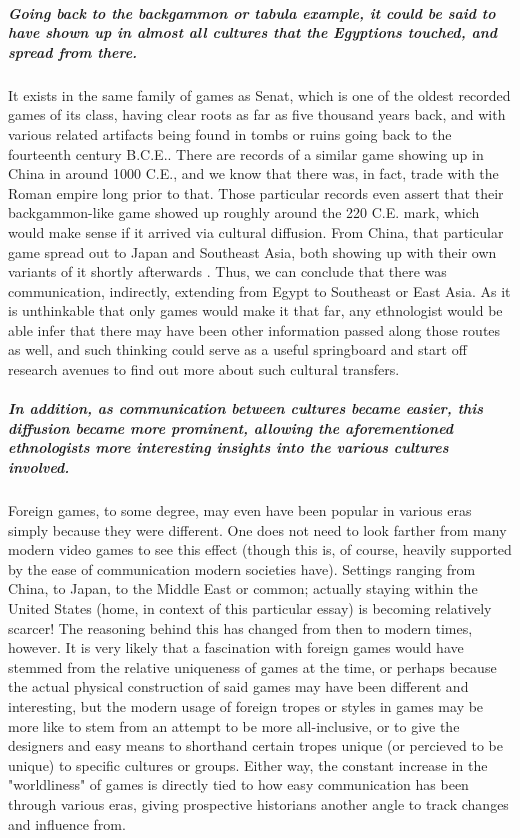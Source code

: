 \subparagraph{Going back to the backgammon or tabula example, it could be said to have shown up in almost all cultures that the Egyptions touched, and spread from there.}
It exists in the same family of games as Senat, which is one of the oldest recorded games of its class, having clear roots as far as five thousand years back, and with various related artifacts being found
in tombs or ruins going back to the fourteenth century B.C.E..
There are records of a similar game showing up in China in around 1000 C.E., and we know that there was, in fact, trade with the Roman empire long prior to that.
Those particular records even assert that their backgammon-like game showed up roughly around the 220 C.E. mark, which would make sense if it arrived via cultural diffusion.
From China, that particular game spread out to Japan and Southeast Asia, both showing up with their own variants of it shortly afterwards \citep{botermans2008}.
Thus, we can conclude that there was communication, indirectly, extending from Egypt to Southeast or East Asia.
As it is unthinkable that only games would make it that far, any ethnologist would be able infer that there may have been other information passed along those routes as well,
and such thinking could serve as a useful springboard and start off research avenues to find out more about such cultural transfers.

\subparagraph{In addition, as communication between cultures became easier, this diffusion became more prominent, allowing the aforementioned ethnologists more interesting insights into the various cultures involved.}
Foreign games, to some degree, may even have been popular in various eras simply because they were different.
One does not need to look farther from many modern video games to see this effect (though this is, of course, heavily supported by the ease of communication modern societies have).
Settings ranging from China, to Japan, to the Middle East or common; actually staying within the United States (home, in context of this particular essay) is becoming relatively scarcer! \citep{johnson2009}
The reasoning behind this has changed from then to modern times, however.
It is very likely that a fascination with foreign games would have stemmed from the relative uniqueness of games at the time, or perhaps because the actual physical construction of said games may have been different and interesting,
but the modern usage of foreign tropes or styles in games may be more like to stem from an attempt to be more all-inclusive, or to give the designers and easy means to shorthand certain tropes unique (or percieved to be unique)
to specific cultures or groups.
Either way, the constant increase in the "worldliness" of games is directly tied to how easy communication has been through various eras, giving prospective historians another angle to track changes and influence from.

